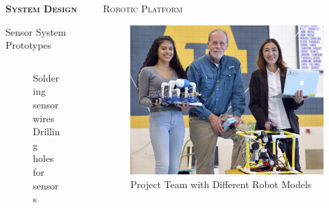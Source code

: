 \documentclass[final,t]{beamer}
\begin{document}
\begin{frame}{}
\begin{columns}
\begin{column}{.5\linewidth}
\begin{exampleblock}{\textsc{\textbf{System Design}}}
\begin{block}{Sensor System Prototypes}
\begin{center}
\begin{figure}
\begin{tabular}{cc}
                    \end{tabular}
                    \caption{Soldering sensor wires \hspace{30mm} Drilling holes for sensors}
                    \end{figure}
                    \end{center}
                    
  					\end{block}
                \end{exampleblock}
            \end{column}

            \begin{column}{.5\linewidth}

                \begin{block}{\textsc{Robotic Platform}}
                    \vspace*{3mm}
                    \begin{figure}
                    \centering
                        \includegraphics[scale = 0.9]{assets/group_pic.jpg}
                        \caption{Project Team with Different Robot Models}
                    \end{figure}
                    

\end{block}
\end{column}
\end{columns}
\end{frame}
\end{document}
